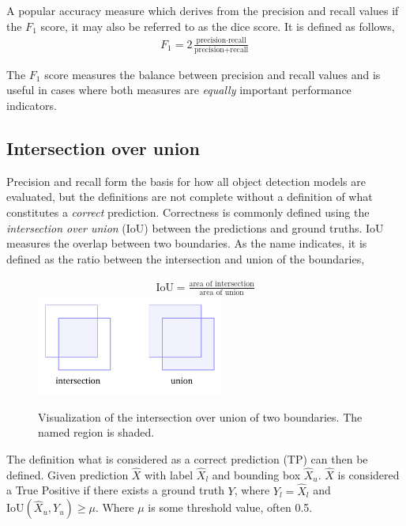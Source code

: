 A popular accuracy measure which derives from the precision and recall values if the \(F_1\) score, it may also be referred to as the dice score.
It is defined as follows,
%
\begin{align*}
  F_1=2\frac{\text{precision}\cdot\text{recall}}{\text{precision}+\text{recall}}
\end{align*}

The \(F_1\) score measures the balance between precision and recall values and is useful in cases where both measures are \textit{equally} important performance indicators.

\subsection{Intersection over union}
Precision and recall form the basis for how all object detection models are evaluated, but the definitions are not complete without a definition of what constitutes a \textit{correct} prediction.
Correctness is commonly defined using the \textit{intersection over union} (IoU) between the predictions and ground truths.
IoU measures the overlap between two boundaries.
As the name indicates, it is defined as the ratio between the intersection and union of the boundaries,

\begin{figure}[htb]
  \centering
  \begin{gather*}
    \text{IoU}=\frac{\text{area of intersection}}{\text{area of union}}
  \end{gather*}
  \includegraphics[width=0.55\textwidth]{figs/background/iou.pdf}
\caption[Intersection over union]{Visualization of the intersection over union of two boundaries.
The named region is shaded.}\label{fig:iou}
\end{figure}

The definition what is considered as a correct prediction (TP) can then be defined.
Given prediction \(\hat{X}\) with label \(\hat{X}_l\) and bounding box \(\hat{X}_u\). \(\hat{X}\) is considered a True Positive if there exists a ground truth \(Y\), where \(Y_{l}=\hat{X}_l\) and \(\text{IoU}(\hat{X}_u, Y_{u})\ge \mu \).
Where \( \mu \) is some threshold value, often 0.5.

